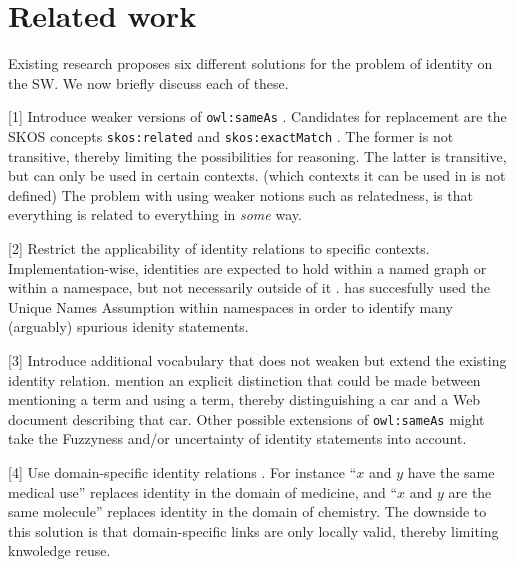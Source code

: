 \section{Related work}
\label{sec:related_work}

Existing research proposes six different solutions for
  the problem of identity on the SW.
We now briefly discuss each of these.

[1] Introduce weaker versions
  of \texttt{owl:sameAs} \cite{HalpinHayes2010,MccuskerMcguinness2010}.
Candidates for replacement are
  the SKOS concepts \texttt{skos:related} and \texttt{skos:exactMatch}
  \cite{MilesBechhofer2009}.
The former is not transitive,
  thereby limiting the possibilities for reasoning.
The latter is transitive,
  but can only be used in certain contexts.
  (which contexts it can be used in is not defined) \cite{MilesBechhofer2009}
The problem with using weaker notions such as relatedness,
  is that everything is related to everything in \emph{some} way.

[2] Restrict the applicability of identity relations to specific contexts.
Implementation-wise, identities are expected to hold
  within a named graph or within a namespace,
  but not necessarily outside of it \cite{HalpinHayes2010}.
\cite{Melo2013} has succesfully used the Unique Names Assumption
  within namespaces in order to identify many (arguably) spurious
  idenity statements.

[3] Introduce additional vocabulary that does not weaken but extend
  the existing identity relation.
\cite{HalpinHayes2010} mention an explicit distinction that could be made
  between mentioning a term and using a term,
  thereby distinguishing a car and a Web document describing that car.
Other possible extensions of \texttt{owl:sameAs} might take
  the Fuzzyness and/or uncertainty of identity statements into account.

[4] Use domain-specific identity relations \cite{MccuskerMcguinness2010}.
  For instance
      ``$x$ and $y$ have the same medical use''
    replaces
      identity in the domain of medicine,
  and
      ``$x$ and $y$ are the same molecule''
    replaces
      identity in the domain of chemistry.
The downside to this solution is that domain-specific links are
  only locally valid, thereby limiting knwoledge reuse.

